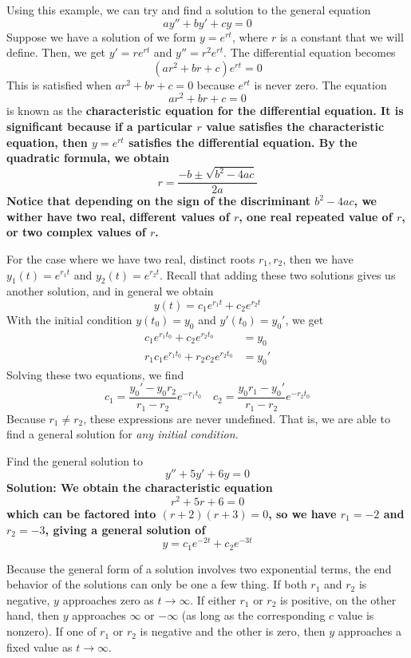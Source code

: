 Using this example, we can try and find a solution to the general equation
\[ ay'' + by' + cy = 0 \]
Suppose we have a solution of we form $y = e^{rt}$, where $r$ is a constant that we will define. Then, we get $y' = re^{rt}$ and $y'' = r^2e^{rt}$. The differential equation becomes
\[ (ar^2 + br + c)e^{rt} = 0\]
This is satisfied when $ar^2 + br + c = 0$ because $e^{rt}$ is never zero. The equation
\[ ar^2 +br + c = 0\]
is known as the \bf{characteristic equation} for the differential equation. It is significant because if a particular $r$ value satisfies the characteristic equation, then $y = e^{rt}$ satisfies the differential equation. By the quadratic formula, we obtain
\[ r = \frac{-b \pm \sqrt{b^2 - 4ac}}{2a}\]
Notice that depending on the sign of the discriminant $b^2-4ac$, we wither have two real, different values of $r$, one real repeated value of $r$, or two complex values of $r$. \par
For the case where we have two real, distinct roots $r_1, r_2$, then we have $y_1(t) = e^{r_1t}$ and $y_2(t) = e^{r_2t}$. Recall that adding these two solutions gives us another solution, and in general we obtain
\[ y(t) = c_1 e^{r_1t} + c_2 e^{r_2 t}\]
With the initial condition $y(t_0) = y_0$ and $y'(t_0) = y_0'$, we get
\begin{align*}
    c_1e^{r_1t_0} + c_2e^{r_2t_0} &= y_0 \\
    r_1c_1e^{r_1t_0} + r_2c_2e^{r_2t_0} &= y_0'
\end{align*}
Solving these two equations, we find
\[ c_1 = \frac{y_0' - y_0r_2}{r_1 - r_2}e^{-r_1t_0} \quad c_2 = \frac{y_0r_1 - y_0'}{r_1-r_2}e^{-r_2t_0}\]
Because $r_1\neq r_2$, these expressions are never undefined. That is, we are able to find a general solution for \it{any} initial condition.
\begin{example}
    Find the general solution to
    \[ y'' + 5y' + 6y = 0\]
    \bf{Solution:} We obtain the characteristic equation
    \[ r^2 + 5r + 6 = 0\]
    which can be factored into $(r+2)(r+3) = 0$, so we have $r_1 = -2$ and $r_2 = -3$, giving a general solution of
    \[ y = c_1e^{-2t} + c_2e^{-3t} \]
\end{example}
Because the general form of a solution involves two exponential terms, the end behavior of the solutions can only be one a few thing. If both $r_1$ and $r_2$ is negative, $y$ approaches zero as $t\to\infty$. If either $r_1$ or $r_2$ is positive, on the other hand, then $y$ approaches $\infty$ or $-\infty$ (as long as the corresponding $c$ value is nonzero). If one of $r_1$ or $r_2$ is negative and the other is zero, then $y$ approaches a fixed value as $t\to\infty$. 

